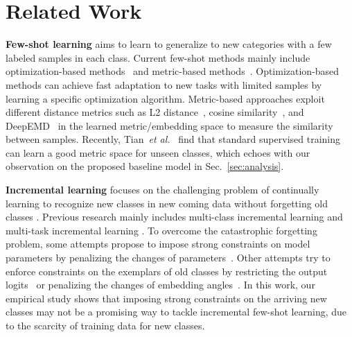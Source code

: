 \documentclass{article}
\begin{document}
 \section{Related Work}

\textbf{Few-shot learning} aims to learn to generalize to new categories with a few labeled samples in each class. Current few-shot methods mainly include optimization-based methods~\cite{finn2017model,jamal2019task,liu2020ensemble,ravi2016optimization,sun2020meta,sun2019meta,yue2020interventional} and metric-based methods~\cite{gidaris2018dynamic,hou2019cross,PN,vinyals2016matching,ye2021learning,zhang2020deepemd,zhang2020deepemdd,ye2020few}. Optimization-based methods can achieve fast adaptation to new tasks with limited samples by learning a specific optimization algorithm.
Metric-based approaches exploit different distance metrics such as L2 distance~\cite{PN}, cosine similarity~\cite{vinyals2016matching}, and DeepEMD~\cite{zhang2020deepemd} in the learned metric/embedding space to measure the similarity between samples. 
Recently, Tian~\emph{et al.}~\cite{Tian2020RethinkingFI} find that standard supervised training 
can learn a good metric space 
for unseen classes,
which echoes with our observation on the proposed baseline model in Sec.~\ref{sec:analysis}.


\textbf{Incremental learning} focuses on the challenging problem of continually learning to recognize new classes in new coming data without forgetting old classes \cite{chaudhry2018efficient,chen2020mitigating,Dhar_2019_CVPR, liu2021Adaptive}. Previous research mainly includes multi-class incremental learning \cite{castro2018end, rajasegaran2020itaml, hu2021distilling,liu2020mnemonics,Yu2020SemanticDC, liu2021Adaptive} and multi-task incremental learning \cite{hu2018overcoming,Lwf,riemer2018learning}. To overcome the catastrophic forgetting problem, some attempts propose to impose strong constraints on model parameters by penalizing the changes of parameters~\cite{kirkpatrick2017overcoming,aljundi2018memory}.
Other attempts try to enforce constraints on the exemplars of old classes by restricting the output logits~\cite{icarl} or penalizing the changes of embedding angles~\cite{NCM}. In this work, our empirical study shows that imposing strong constraints on the arriving new classes may not be a promising way to tackle incremental few-shot learning, due to the scarcity of training data for new classes.
\end{document}
